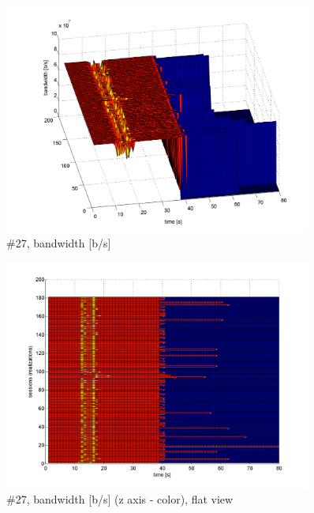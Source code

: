 \begin{figure}[hp]
	\begin{center}
	\includegraphics[width=0.9\textwidth]{results-279-3d.png}
	\end{center}
	\caption[]{\#27, bandwidth [b/s]}
	\label{img:results-279-3d.png}
\end{figure}
\begin{figure}[hp]
	\begin{center}
	\includegraphics[width=0.9\textwidth]{results-279-2d.png}
	\end{center}
	\caption[]{\#27, bandwidth [b/s] (z axis - color), flat view}
	\label{img:results-279-2d.png}
\end{figure}
\FloatBarrier

